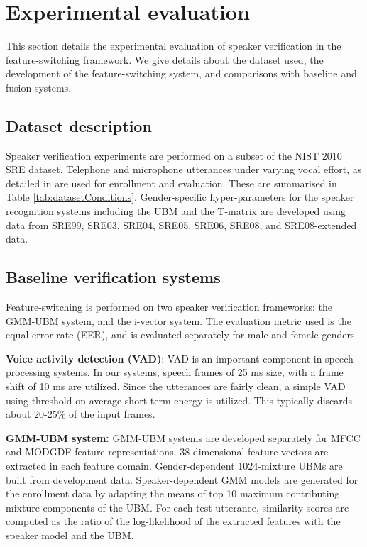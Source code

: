 \documentclass[preprint,12pt,5p]{elsarticle}
\begin{document}
\section{Experimental evaluation}
\label{sec:expts}
This section details the experimental evaluation of speaker verification in the
feature-switching framework. We give details about the dataset used, the
development of the feature-switching system, and comparisons with baseline and
fusion systems.

\subsection{Dataset description}
\label{sec:dB}
Speaker verification experiments are performed on a subset of
the NIST 2010 SRE dataset. Telephone and microphone utterances under varying 
vocal effort, as detailed in \cite{nist2010SRE} are used for enrollment and 
evaluation. These are summarised in Table \ref{tab:datasetConditions}. 
Gender-specific hyper-parameters for the speaker recognition systems including 
the UBM and the T-matrix are developed using data 
from SRE99, SRE03, SRE04, SRE05, SRE06, SRE08, and SRE08-extended data.

\subsection{Baseline verification systems}
\label{subsec:baseline}
Feature-switching is performed on two speaker verification frameworks: the GMM-UBM system, 
and the i-vector system. The evaluation
metric used is the equal error rate (EER), and is evaluated separately
for male and female genders.

\textbf{Voice activity detection (VAD)}: VAD is an important component in speech
processing systems. In our systems, speech frames of 25 ms size, with a frame
shift of 10 ms are utilized. Since the utterances are fairly clean, a simple VAD
using threshold on average short-term energy is utilized. This typically
discards about 20-25\% of the input frames.

\textbf{GMM-UBM system:} GMM-UBM systems are developed separately for 
MFCC and MODGDF feature representations. 38-dimensional feature vectors are 
extracted in each feature domain. Gender-dependent 1024-mixture UBMs are built 
from development data.  Speaker-dependent GMM models are generated for the 
enrollment data by adapting the means of top 10 maximum contributing mixture 
components of the UBM. For each test utterance, similarity scores are computed 
as the ratio of the log-likelihood of the extracted features with the speaker
model and the UBM.
\end{document}

